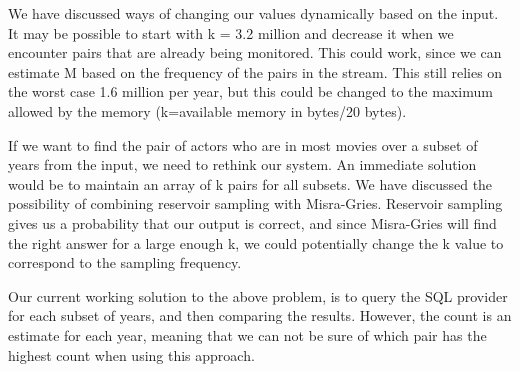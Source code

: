 We have discussed ways of changing our values dynamically based on the input. It may be possible to start with k = 3.2 million and decrease it when we encounter pairs that are already being monitored. This could work, since we can estimate M based on the frequency of the pairs in the stream. This still relies on the worst case 1.6 million per year, but this could be changed to the maximum allowed by the memory (k=available memory in bytes/20 bytes).

If we want to find the pair of actors who are in most movies over a subset of years from the input, we need to rethink our system. An immediate solution would be to maintain an array of k pairs for all subsets. We have discussed the possibility of combining reservoir sampling with Misra-Gries. Reservoir sampling gives us a probability that our output is correct, and since Misra-Gries will find the right answer for a large enough k, we could potentially change the k value to correspond to the sampling frequency. 

Our current working solution to the above problem, is to query the SQL provider for each subset of years, and then comparing the results. However, the count is an estimate for each year, meaning that we can not be sure of which pair has the highest count when using this approach. 
